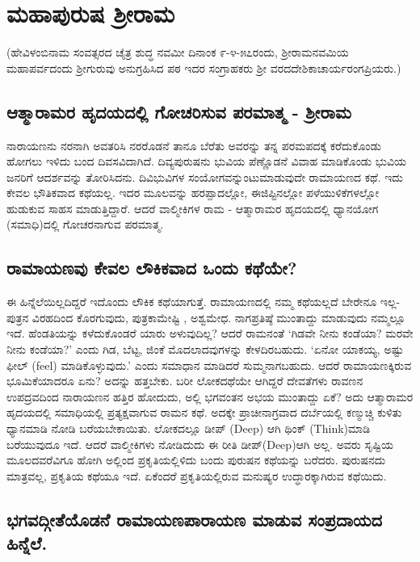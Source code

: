 \chapter{ಮಹಾಪುರುಷ ಶ್ರೀರಾಮ}

(ಹೇವಿಳಂಬಿನಾಮ ಸಂವತ್ಸರದ ಚೈತ್ರ ಶುದ್ಧ ನವಮೀ ದಿನಾಂಕ ೯-೪-೫೭ರಂದು, ಶ್ರೀರಾಮನವಮಿಯ ಮಹಾಪರ್ವದಂದು ಶ್ರೀಗುರುವು ಅನುಗ್ರಹಿಸಿದ ಪಠ ಇದರ ಸಂಗ್ರಾಹಕರು ಶ್ರೀ ವರದದೇಶಿಕಾಚಾರ್ಯರಂಗಪ್ರಿಯರು.)

\section*{ಆತ್ಮಾರಾಮರ ಹೃದಯದಲ್ಲಿ ಗೋಚರಿಸುವ ಪರಮಾತ್ಮ - ಶ್ರೀರಾಮ}

ನಾರಾಯಣನು ನರನಾಗಿ ಅವತರಿಸಿ ನರರೊಡನೆ ತಾನೂ ಬೆರೆತು ಅವರನ್ನು ತನ್ನ ಪರಮಪದಕ್ಕೆ ಕರೆದುಕೊಂಡು ಹೋಗಲು ಇಳಿದು ಬಂದ ದಿವಸವಿದಾಗಿದೆ. ದಿವ್ಯಪುರುಷನು ಭುವಿಯ ಪೆಣ್ಣೊಡನೆ ವಿವಾಹ ಮಾಡಿಕೊಂಡು ಭುವಿಯ ಜನರಿಗೆ ಆದರ್ಶವನ್ನು ತೋರಿಸಿದನು. ದಿವಿಭುವಿಗಳ ಸಂಯೋಗವನ್ನುಂಟುಮಾಡುವುದೇ ರಾಮಾಯಣದ ಕಥೆ. ಇದು ಕೇವಲ ಭೌತಿಕವಾದ ಕಥೆಯಲ್ಲ. ಇದರ ಮೂಲವನ್ನು ಹರಪ್ಪಾದಲ್ಲೋ, ಈಜಿಪ್ಟಿನಲ್ಲೋ ಪಳೆಯುಳಿಕೆಗಳಲ್ಲೋ ಹುಡುಕುವ ಸಾಹಸ ಮಾಡುತ್ತಿದ್ದಾರೆ. ಆದರೆ ವಾಲ್ಮೀಕಿಗಳ ರಾಮ - ಆತ್ಮಾರಾಮರ ಹೃದಯದಲ್ಲಿ ಧ್ಯಾನಯೋಗ (ಸಮಾಧಿ)ದಲ್ಲಿ ಗೋಚರನಾಗುವ ಪರಮಾತ್ಮ.

\section*{ರಾಮಾಯಣವು ಕೇವಲ ಲೌಕಿಕವಾದ ಒಂದು ಕಥೆಯೇ?}

ಈ ಹಿನ್ನೆಲೆಯಿಲ್ಲದಿದ್ದರೆ ಇದೊಂದು ಲೌಕಿಕ ಕಥೆಯಾಗುತ್ತೆ. ರಾಮಾಯಣದಲ್ಲಿ ನಮ್ಮ ಕಥೆಯಲ್ಲದೆ ಬೇರೇನೂ ಇಲ್ಲ- ಪುತ್ರನ ವಿರಹದಿಂದ ಕೊರಗುವುದು, ಪುತ್ರಕಾಮೇಷ್ಟಿ , ಅಶ್ವಮೇಧ. ನಾಗಪ್ರತಿಷ್ಠೆ ಮುಂತಾದ್ದು ಮಾಡುವುದು ನಮ್ಮಲ್ಲೂ ಇದೆ. ಹೆಂಡತಿಯನ್ನು ಕಳೆದುಕೊಂಡರೆ ಯಾರು ಅಳುವುದಿಲ್ಲ? ಆದರೆ ರಾಮನಂತೆ `ಗಿಡವೇ ನೀನು ಕಂಡೆಯಾ? ಮರವೇ ನೀನು ಕಂಡೆಯಾ?' ಎಂದು ಗಿಡ, ಬೆಟ್ಟ, ಜಿಂಕೆ ಮೊದಲಾದವುಗಳನ್ನು ಕೇಳದಿರಬಹುದು. `ಏನೋ ಯಾಕಯ್ಯ, ಅಷ್ಟು ಫೀಲ್ ({\eng feel}) ಮಾಡಿಕೊಳ್ಳುವುದು.' ಎಂದು ಸಮಾಧಾನ ಮಾಡಿದರೆ ಸುಮ್ಮನಾಗಬಹುದು. ಆದರೆ ರಾಮಾಯಣಕ್ಕಿರುವ ಭೂಮಿಕೆಯಾದರೂ ಏನು? ಅದನ್ನು ಹತ್ತಬೇಕು. ಬರೀ ಲೋಕದಥೆಯೇ ಆಗಿದ್ದರೆ ದೇವತೆಗಳು ರಾವಣನ ಉಪದ್ರವದಿಂದ ನಾರಾಯಣನ ಹತ್ತಿರ ಹೋದುದು, ಅಲ್ಲಿ ಭಗವಂತನ ಅಭಯ ಮುಂತಾದ್ದು ಏಕೆ? ಅದು ಆತ್ಮಾರಾಮರ ಹೃದಯದಲ್ಲಿ ಸಮಾಧಿಯಲ್ಲಿ ಪ್ರತ್ಯಕ್ಷವಾಗುವ ರಾಮನ ಕಥೆ. ಅದಕ್ಕೇ ಪ್ರಾಚೀನಾಗ್ರವಾದ ದರ್ಬೆಯಲ್ಲಿ ಕಣ್ಮುಚ್ಚಿ ಕುಳಿತು ಧ್ಯಾನಮಾಡಿ ನೋಡಿ ಬರೆಯಬೇಕಾಯಿತು. ಲೋಕದಲ್ಲೂ ಡೀಪ್ ({\eng Deep}) ಆಗಿ ಥಿಂಕ್ ({\eng Think})ಮಾಡಿ ಬರೆಯುವುದೂ ಇದೆ. ಆದರೆ ವಾಲ್ಮೀಕಿಗಳು ನೋಡಿದುದು ಈ ರೀತಿ ಡೀಪ್({\eng Deep})ಆಗಿ ಅಲ್ಲ. ಅವರು ಸೃಷ್ಟಿಯ ಮೂಲದವರೆವಿಗೂ ಹೋಗಿ ಅಲ್ಲಿಂದ ಪ್ರಕೃತಿಯಲ್ಲಿಳಿದು ಬಂದು ಪುರುಷನ ಕಥೆಯನ್ನು ಬರೆದರು. ಪುರುಷನದು ಮಾತ್ರವಲ್ಲ, ಪ್ರಕೃತಿಯ ಕಥೆಯೂ ಇದೆ. ಏಕೆಂದರೆ ಪ್ರಕೃತಿಯಲ್ಲಿರುವ ಮನುಷ್ಯರ ಉದ್ಧಾರಕ್ಕಾಗಿರುವ ಕಥೆಯಿದು.

\section*{ಭಗವದ್ಗೀತೆಯೊಡನೆ ರಾಮಾಯಣಪಾರಾಯಣ ಮಾಡುವ ಸಂಪ್ರದಾಯದ ಹಿನ್ನೆಲೆ.}

